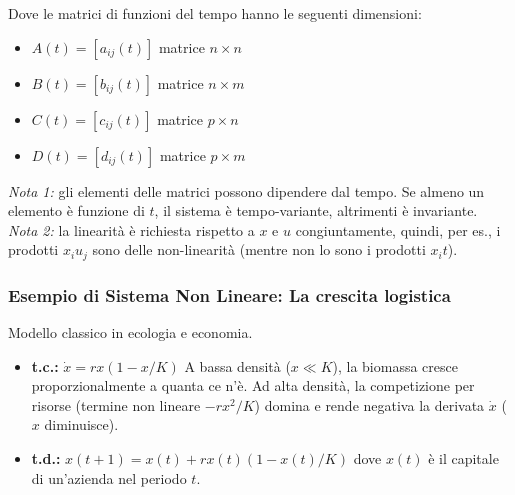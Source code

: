 \documentclass[11pt,a4paper]{article}
\begin{document}
Dove le matrici di funzioni del tempo hanno le seguenti dimensioni:
\begin{itemize}
    \item $A(t) = [a_{ij}(t)]$ matrice $n \times n$
    \item $B(t) = [b_{ij}(t)]$ matrice $n \times m$
    \item $C(t) = [c_{ij}(t)]$ matrice $p \times n$
    \item $D(t) = [d_{ij}(t)]$ matrice $p \times m$
\end{itemize}

\textit{Nota 1:} gli elementi delle matrici possono dipendere dal tempo. Se almeno un elemento è funzione di $t$, il sistema è tempo-variante, altrimenti è invariante. \\
\textit{Nota 2:} la linearità è richiesta rispetto a $x$ e $u$ congiuntamente, quindi, per es., i prodotti $x_i u_j$ sono delle non-linearità (mentre non lo sono i prodotti $x_i t$).

\subsubsection{Esempio di Sistema Non Lineare: La crescita logistica}
Modello classico in ecologia e economia.
\begin{itemize}
    \item \textbf{t.c.:} $\dot{x} = rx(1 - x/K)$
    A bassa densità ($x \ll K$), la biomassa cresce proporzionalmente a quanta ce n'è. Ad alta densità, la competizione per risorse (termine non lineare $-rx^2/K$) domina e rende negativa la derivata $\dot{x}$ ($x$ diminuisce).
    \item \textbf{t.d.:} $x(t+1) = x(t) + rx(t)(1 - x(t)/K)$ dove $x(t)$ è il capitale di un'azienda nel periodo $t$.
\end{itemize}
\end{document}
